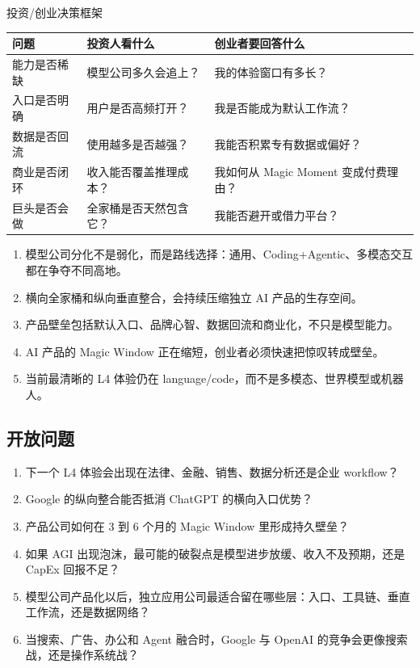 \begin{knowledgebox}{投资/创业决策框架}
\begin{tabularx}{\textwidth}{p{}p{}X}
\toprule
问题 & 投资人看什么 & 创业者要回答什么 \\
\midrule
能力是否稀缺 & 模型公司多久会追上？ & 我的体验窗口有多长？ \\
入口是否明确 & 用户是否高频打开？ & 我是否能成为默认工作流？ \\
数据是否回流 & 使用越多是否越强？ & 我能否积累专有数据或偏好？ \\
商业是否闭环 & 收入能否覆盖推理成本？ & 我如何从 Magic Moment 变成付费理由？ \\
巨头是否会做 & 全家桶是否天然包含它？ & 我能否避开或借力平台？ \\
\bottomrule
\end{tabularx}
\end{knowledgebox}

\begin{enumerate}
\item 模型公司分化不是弱化，而是路线选择：通用、Coding+Agentic、多模态交互都在争夺不同高地。
\item 横向全家桶和纵向垂直整合，会持续压缩独立 AI 产品的生存空间。
\item 产品壁垒包括默认入口、品牌心智、数据回流和商业化，不只是模型能力。
\item AI 产品的 Magic Window 正在缩短，创业者必须快速把惊叹转成壁垒。
\item 当前最清晰的 L4 体验仍在 language/code，而不是多模态、世界模型或机器人。
\end{enumerate}

\subsection{开放问题}

\begin{enumerate}
\item 下一个 L4 体验会出现在法律、金融、销售、数据分析还是企业 workflow？
\item Google 的纵向整合能否抵消 ChatGPT 的横向入口优势？
\item 产品公司如何在 3 到 6 个月的 Magic Window 里形成持久壁垒？
\item 如果 AGI 出现泡沫，最可能的破裂点是模型进步放缓、收入不及预期，还是 CapEx 回报不足？
\item 模型公司产品化以后，独立应用公司最适合留在哪些层：入口、工具链、垂直工作流，还是数据网络？
\item 当搜索、广告、办公和 Agent 融合时，Google 与 OpenAI 的竞争会更像搜索战，还是操作系统战？
\end{enumerate}

